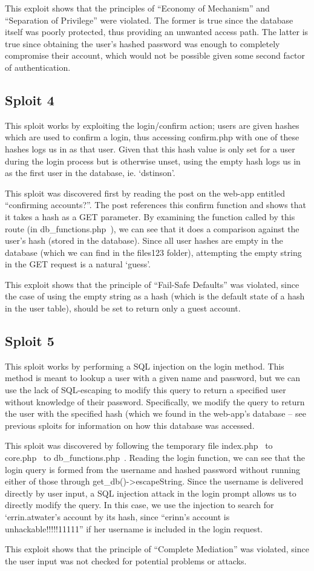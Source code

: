 \documentclass[12pt]{article}
\begin{document}
This exploit shows that the principles of ``Economy of Mechanism'' and ``Separation of Privilege'' were violated. The former is true since the database itself was poorly protected, thus providing an unwanted access path. The latter is true since obtaining the user's hashed password was enough to completely compromise their account, which would not be possible given some second factor of authentication.

\subsection*{Sploit 4}
This sploit works by exploiting the login/confirm action; users are given hashes which are used to confirm a login, thus accessing confirm.php with one of these hashes logs us in as that user. Given that this hash value is only set for a user during the login process but is otherwise unset, using the empty hash logs us in as the first user in the database, ie. `dstinson'.

This sploit was discovered first by reading the post on the web-app entitled ``confirming accounts?''. The post references this confirm function and shows that it takes a hash as a GET parameter. By examining the function called by this route (in db\_functions.php~), we can see that it does a comparison against the user's hash (stored in the database). Since all user hashes are empty in the database (which we can find in the files123 folder), attempting the empty string in the GET request is a natural `guess'.

This exploit shows that the principle of ``Fail-Safe Defaults'' was violated, since the case of using the empty string as a hash (which is the default state of a hash in the user table), should be set to return only a guest account.

\subsection*{Sploit 5}
This sploit works by performing a SQL injection on the login method. This method is meant to lookup a user with a given name and password, but we can use the lack of SQL-escaping to modify this query to return a specified user without knowledge of their password. Specifically, we modify the query to return the user with the specified hash (which we found in the web-app's database -- see previous sploits for information on how this database was accessed.

This sploit was discovered by following the temporary file index.php~ to core.php~ to db\_functions.php~. Reading the login function, we can see that the login query is formed from the username and hashed password without running either of those through get\_db()->escapeString. Since the username is delivered directly by user input, a SQL injection attack in the login prompt allows us to directly modify the query. In this case, we use the injection to search for `errin.atwater's account by its hash, since ``erinn's account is unhackable!!!!!11111'' if her username is included in the login request.

This exploit shows that the principle of ``Complete Mediation'' was violated, since the user input was not checked for potential problems or attacks.
\end{document}

